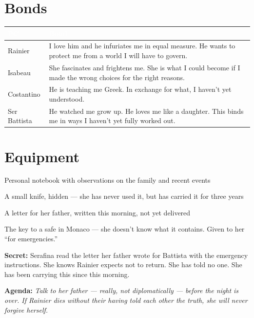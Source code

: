 \section*{Bonds}
\begin{table}[h]\centering\renewcommand{\arraystretch}{1.4}
\begin{tabularx}{\linewidth}{@{}L{2.6cm} X@{}}
\toprule{}
\textcolor{white}{\textbf{PC}} & \textcolor{white}{\textbf{Bond}} \\
\midrule
Rainier & I love him and he infuriates me in equal measure. He wants to protect me from a world I will have to govern. \\
Isabeau & She fascinates and frightens me. She is what I could become if I made the wrong choices for the right reasons. \\
Costantino & He is teaching me Greek. In exchange for what, I haven't yet understood. \\
Ser Battista & He watched me grow up. He loves me like a daughter. This binds me in ways I haven't yet fully worked out. \\
\bottomrule
\end{tabularx}
\end{table}

\section*{Equipment}
\begin{goldlist}
\item Personal notebook with observations on the family and recent events
\item A small knife, hidden --- she has never used it, but has carried it for three years
\item A letter for her father, written this morning, not yet delivered
\item The key to a safe in Monaco --- she doesn't know what it contains. Given to her ``for emergencies.''
\end{goldlist}

\clearpage
\begin{secretbox}
\textbf{Secret:} Serafina read the letter her father wrote for Battista with the
emergency instructions. She knows Rainier expects not to return. She has told no
one. She has been carrying this since this morning.

\medskip\noindent\textcolor{SecretRed}{\textbf{Agenda:}} \textit{Talk to her father
--- really, not diplomatically --- before the night is over. If Rainier dies without
their having told each other the truth, she will never forgive herself.}
\end{secretbox}

